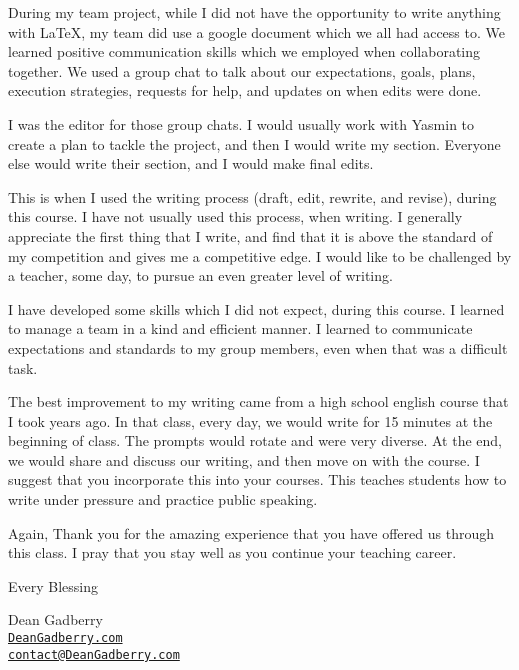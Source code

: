 \documentclass[12pt,a4paper,english]{article}
\begin{document}
\begin{flushleft}
During my team project, while I did not have the opportunity to write anything with \LaTeX{}, my team did use a google document which we all had access to. We learned positive communication skills which we employed when collaborating together. We used a group chat to talk about our expectations, goals, plans, execution strategies, requests for help, and updates on when edits were done.

I was the editor for those group chats. I would usually work with Yasmin to create a plan to tackle the project, and then I would write my section. Everyone else would write their section, and I would make final edits. 

This is when I used the writing process (draft, edit, rewrite, and revise), during this course. I have not usually used this process, when writing. I generally appreciate the first thing that I write, and find that it is above the standard of my competition and gives me a competitive edge. I would like to be challenged by a teacher, some day, to pursue an even greater level of writing.

I have developed some skills which I did not expect, during this course. I learned to manage a team in a kind and efficient manner. I learned to communicate expectations and standards to my group members, even when that was a difficult task.

The best improvement to my writing came from a high school english course that I took years ago. In that class, every day, we would write for 15 minutes at the beginning of class. The prompts would rotate and were very diverse. At the end, we would share and discuss our writing, and then move on with the course. I suggest that you incorporate this into your courses. This teaches students how to write under pressure and practice public speaking.

Again, Thank you for the amazing experience that you have offered us through this class. I pray that you stay well as you continue your teaching career. 

\hfill\break
\hfill\break
Every Blessing

Dean Gadberry \\
\href{https://www.deangadberry.com}{\texttt{DeanGadberry.com}}\\
\href{mailto:contact@deangadberry.com}{\texttt{contact@DeanGadberry.com}}\\

\end{flushleft}
\end{document}
